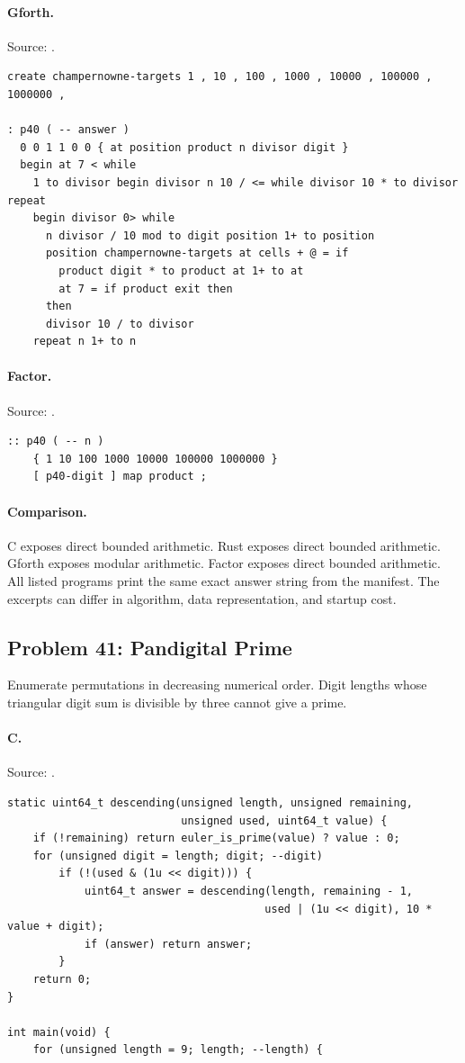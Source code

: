 \paragraph{Gforth.} Source: .
\begin{lstlisting}
create champernowne-targets 1 , 10 , 100 , 1000 , 10000 , 100000 , 1000000 ,

: p40 ( -- answer )
  0 0 1 1 0 0 { at position product n divisor digit }
  begin at 7 < while
    1 to divisor begin divisor n 10 / <= while divisor 10 * to divisor repeat
    begin divisor 0> while
      n divisor / 10 mod to digit position 1+ to position
      position champernowne-targets at cells + @ = if
        product digit * to product at 1+ to at
        at 7 = if product exit then
      then
      divisor 10 / to divisor
    repeat n 1+ to n
\end{lstlisting}

\paragraph{Factor.} Source: .
\begin{lstlisting}
:: p40 ( -- n )
    { 1 10 100 1000 10000 100000 1000000 }
    [ p40-digit ] map product ;
\end{lstlisting}

\paragraph{Comparison.}
C exposes direct bounded arithmetic. Rust exposes direct bounded arithmetic. Gforth exposes modular arithmetic. Factor exposes direct bounded arithmetic.
All listed programs print the same exact answer string from the manifest. The excerpts can differ in algorithm, data representation, and startup cost.

\subsection{Problem 41: Pandigital Prime}
\label{walkthrough:p41}
Enumerate permutations in decreasing numerical order. Digit lengths whose triangular digit sum is divisible by three cannot give a prime.

\paragraph{C.} Source: .
\begin{lstlisting}
static uint64_t descending(unsigned length, unsigned remaining,
                           unsigned used, uint64_t value) {
    if (!remaining) return euler_is_prime(value) ? value : 0;
    for (unsigned digit = length; digit; --digit)
        if (!(used & (1u << digit))) {
            uint64_t answer = descending(length, remaining - 1,
                                        used | (1u << digit), 10 * value + digit);
            if (answer) return answer;
        }
    return 0;
}

int main(void) {
    for (unsigned length = 9; length; --length) {
\end{lstlisting}

